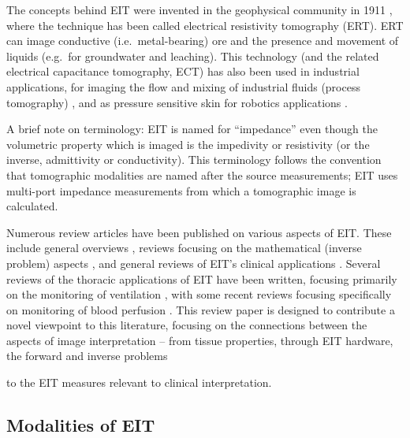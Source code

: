 \documentclass[12pt]{article} \usepackage[margin=3cm]{geometry} \usepackage[margin=20pt,font=small,labelfont=bf]{caption}\def\TBLWIDA{35mm}\def\TBLWIDB{95mm}
\begin{document}
The concepts behind EIT were invented in the 
geophysical community in 1911 \cite{Allaud1977}, where
the technique has been called electrical resistivity
tomography (ERT). ERT can
image conductive (i.e.\ metal-bearing) ore
and the presence and movement of liquids
(e.g.\ for groundwater and leaching).
This technology (and the related electrical capacitance
tomography, ECT) has also been used in industrial
applications, 
 for imaging the flow and mixing of industrial fluids
(process tomography) \cite{Beck1996Process},
and as pressure sensitive skin for robotics applications
\cite{Silvera2015Skin}.

A brief note on terminology: EIT is named for
``impedance'' even though the volumetric property which is
imaged is the impedivity or resistivity (or the inverse,
              admittivity or conductivity)\cite{Bayford2006Bioimpendace}.
This terminology follows the convention that 
tomographic modalities are named after the source measurements;
EIT uses multi-port impedance measurements
from which a tomographic image is calculated.

Numerous review articles have been published on various
aspects of EIT. These include general overviews
\cite{Brown2003EIT, Holder2004Book, Cheney1999EIT},
reviews focusing on the mathematical (inverse problem) aspects
\cite{Adler2016Handbook, Borcea2002EIT, Uhlmann2009EIT}, 
and general reviews of EIT's clinical applications
\cite{Dijkstra1993EIT}.
Several reviews of the thoracic applications of EIT have
been written, focusing primarily on the monitoring of
ventilation
\cite{Adler2012Whither,
      Bodenstein2009EIT,
      Costa2009EIT,
      Frerichs2017Chest,
      Frerichs2014EIT,
      Frerichs2000EIT,
      Lundin2012EIT,
      Riedel2010EIT},
with some recent reviews focusing specifically on 
monitoring of blood perfusion
\cite{Leonhardt2012EIT, Nguyen2012Perfusion}.
This review paper is designed to contribute a novel viewpoint
to this literature, focusing on the connections between 
the aspects of image interpretation -- from tissue
properties, through EIT hardware, the forward and inverse problems

to the EIT measures relevant to clinical interpretation.

\subsection{Modalities of EIT}
\end{document}
